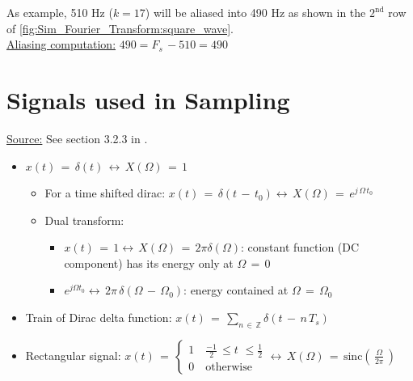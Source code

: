 As example, 510 Hz ($k = 17$) will be aliased into 490 Hz as shown in the $\mathrm{2}^\mathrm{nd}$ row of \autoref{fig:Sim_Fourier_Transform:square_wave}.\\

\underline{Aliasing computation:} $490 = F_s \, - 510 = 490$


\newpage
\section{Signals used in Sampling}

\underline{Source:} See section 3.2.3 in \cite{sampling_beyond_band_limited_systems}.

\begin{itemize}
    \item $x(t) \, = \, \delta(t) \, \leftrightarrow \, X(\Omega) \, = \, 1$
    
    \begin{itemize}
        \item For a time shifted dirac: $x(t) \, = \, \delta(t \,- \, t_0) \leftrightarrow \, X(\Omega) \, = \, e^{j \, \Omega \, t_0}$
        
        
        \item Dual transform: 
        
        \begin{itemize}
            \item $x(t) \, = \, 1 \leftrightarrow \, X(\Omega) \, = \, 2 \pi \delta(\Omega)$: constant function (DC component) has its energy only at $\Omega \, = \, 0$ 
            
            \item $e^{j \Omega t_0} \leftrightarrow \, 2 \pi \, \delta(\Omega \, - \, \Omega_0)$: energy contained at $\Omega \, = \, \Omega_0$
            
        \end{itemize}

    \end{itemize}
    
\item Train of Dirac delta function: $x(t) \, = \, \displaystyle\sum\limits_{n \, \in \, \mathbb{Z}} \delta (t \,- \,  n \, T_s)$      


\newpage
\item Rectangular signal: $x(t) \, = \, \begin{cases}
1 \quad \displaystyle\frac{-1}{2} \, \leq t \, \, \leq \displaystyle\frac{1}{2} \\
0 \quad \text{otherwise}
\end{cases} \leftrightarrow \, X(\Omega) \, = \, \text{sinc}\left(\,  \displaystyle\frac{\Omega}{2 \pi}  \, \right)$


\end{itemize}
